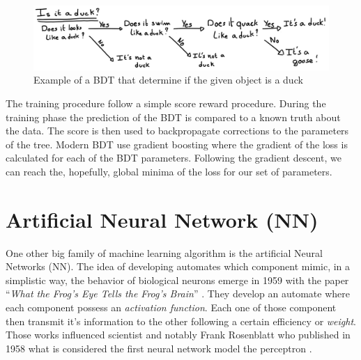\begin{figure}
  \centering
  \includegraphics[width=\linewidth]{images/ml/Bdt.jpg}
  \caption{Example of a BDT that determine if the given object is a duck}
  \label{fig:ml:bdt}
\end{figure}

The training procedure follow a simple score reward procedure. During the training phase the prediction of the BDT is compared to a known truth about the data. The score is then used to backpropagate corrections to the parameters of the tree. Modern BDT use gradient boosting where the gradient of the loss is calculated for each of the BDT parameters. Following the gradient descent, we can reach the, hopefully, global minima of the loss for our set of parameters.

\section{Artificial Neural Network (NN)}

One other big family of machine learning algorithm is the artificial Neural Networks (NN). The idea of developing automates which component mimic, in a simplistic way, the behavior of biological neurons emerge in 1959 with the paper ``\textit{What the Frog's Eye Tells the Frog's Brain}'' \cite{lettvin_what_1959}. They develop an automate where each component possess an \textit{activation function}. Each one of those component then transmit it's information to the other following a certain efficiency or \textit{weight}.
Those works influenced scientist and notably Frank Rosenblatt who published in 1958 what is considered the first neural network model the perceptron \cite{rosenblatt_perceptron_1958}.


